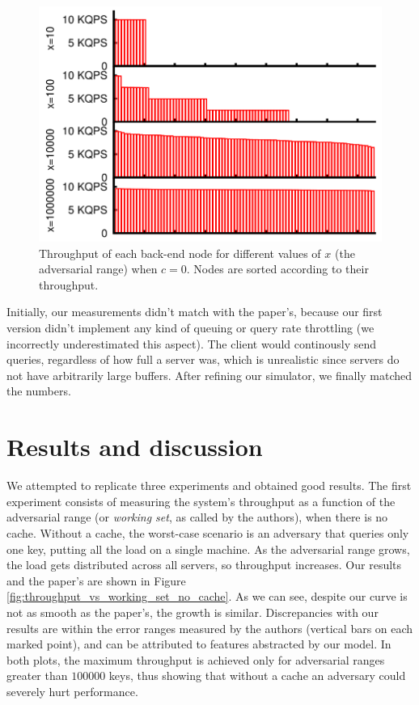 \documentclass[10pt,letterpaper]{article}
\begin{document}
\begin{figure}
	\centering
	\includegraphics[scale=0.25]{img/calibration.png}
	\caption{Throughput of each back-end node for different values of $x$ (the adversarial range) when $c = 0$. Nodes are sorted according to their throughput.}
	\label{fig:calibration}
\end{figure}

Initially, our measurements didn't match with the paper's, because our first version didn't implement any kind of queuing or query rate throttling (we incorrectly underestimated this aspect). The client would continously send queries, regardless of how full a server was, which is unrealistic since servers do not have arbitrarily large buffers. After refining our simulator, we finally matched the numbers.

\section{Results and discussion}
\label{sec:results}

We attempted to replicate three experiments and obtained good results. The first experiment consists of measuring the system's throughput as a function of the adversarial range (or \textit{working set}, as called by the authors), when there is no cache. Without a cache, the worst-case scenario is an adversary that queries only one key, putting all the load on a single machine. As the adversarial range grows, the load gets distributed across all servers, so throughput increases. Our results and the paper's are shown in Figure \ref{fig:throughput_vs_working_set_no_cache}. As we can see, despite our curve is not as smooth as the paper's, the growth is similar. Discrepancies with our results are within the error ranges measured by the authors (vertical bars on each marked point), and can be attributed to features abstracted by our model. In both plots, the maximum throughput is achieved only for adversarial ranges greater than $100000$ keys, thus showing that without a cache an adversary could severely hurt performance.
\end{document}
